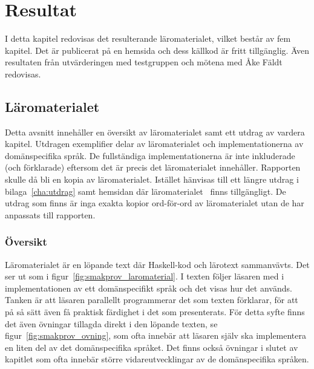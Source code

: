 \chapter{Resultat}

I detta kapitel redovisas det resulterande läromaterialet, vilket består av fem kapitel. Det är publicerat på en hemsida och dess källkod är fritt tillgänglig. Även
resultaten från utvärderingen med testgruppen och mötena med Åke Fäldt redovisas.

\section{Läromaterialet}\label{sec:res_laromaterial}

Detta avsnitt innehåller en översikt av läromaterialet samt ett utdrag av vardera kapitel. Utdragen exemplifier delar av läromaterialet och implementationerna av domänspecifika språk. De fullständiga implementationerna är inte inkluderade (och förklarade) eftersom det är precis det läromaterialet innehåller. Rapporten skulle då bli en kopia av läromaterialet. Istället hänvisas till ett längre utdrag i bilaga~\ref{cha:utdrag} samt hemsidan där läromaterialet~\cite{LYAP} finns tillgängligt. De utdrag som finns är inga exakta kopior ord-för-ord av läromaterialet utan de har anpassats till rapporten.

\subsection{Översikt}

Läromaterialet är en löpande text där Haskell-kod och lärotext sammanvävts. Det ser ut som i figur~\ref{fig:smakprov_laromaterial}. I texten följer läsaren med i implementationen av ett domänspecifikt språk och det visas hur det används. Tanken är att läsaren parallellt programmerar det som texten förklarar, för att på så sätt även få praktisk färdighet i det som presenterats. För detta syfte finns det även övningar tillagda direkt i den löpande texten, se figur~\ref{fig:smakprov_ovning}, som ofta innebär att läsaren själv ska implementera en liten del av det domänspecifika språket. Det finns också övningar i slutet av kapitlet som ofta innebär större vidareutvecklingar av de domänspecifika språken.

